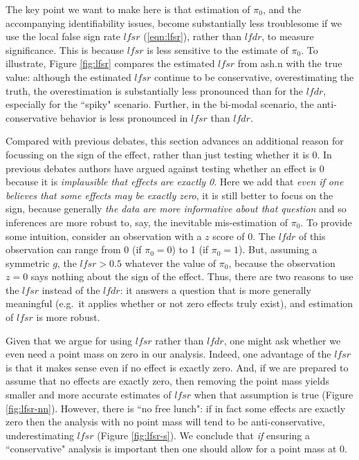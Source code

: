 \documentclass[11pt]{article}
\def\lfdr{\textit{lfdr}}
\def\lfsr{\textit{lfsr}}
\begin{document}
The key point we want to make here is that estimation of $\pi_0$, and the accompanying identifiability issues,
 become substantially less troublesome if we use the local false sign rate $\lfsr$ (\ref{eqn:lfsr}), rather than $\lfdr$, to measure significance. 
 This is because $\lfsr$ is less sensitive to the estimate of $\pi_0$.
To illustrate, Figure \ref{fig:lfsr} compares the estimated $\lfsr$ from ash.n with the true value: although the estimated $\lfsr$ continue to
be conservative, overestimating the truth, the overestimation is substantially less pronounced than for the $\lfdr$, especially for
the ``spiky" scenario. Further, in the bi-modal scenario, the anti-conservative behavior is less pronounced in $\lfsr$ than $\lfdr$.

Compared with previous debates, 
this section advances an additional reason for focussing on the sign of the effect, rather than just testing whether it is 0. 
In previous debates authors have argued against testing whether an effect is 0
because it is {\it implausible that effects are exactly 0}. Here we add that {\it even if one believes
that some effects may be exactly zero}, it is still better to focus on the sign, because generally {\it the data are more informative about that question}
and so inferences are more robust to, say, the inevitable mis-estimation of $\pi_0$.
To provide some intuition, consider an observation with a $z$ score of 0. The $\lfdr$ of this observation can range from 0 (if $\pi_0=0$)
to 1 (if $\pi_0=1$). But, assuming a symmetric $g$, the $\lfsr>0.5$ whatever the value of $\pi_0$, because the observation $z=0$ says
nothing about the sign of the effect.
Thus, there are two reasons to use the $\lfsr$ instead of the $\lfdr$: it answers a question that is more generally meaningful (e.g.~it applies
whether or not zero effects truly exist),  and estimation of $\lfsr$ is more robust. 
 
Given that we argue for using $\lfsr$ rather than $\lfdr$, one might ask whether we even need a point mass on zero in our analysis.
Indeed, one advantage of the $\lfsr$ is that it makes sense even if no effect is exactly zero. And, 
if we are prepared to assume that no effects are exactly zero, then removing the point mass 
yields smaller and more accurate estimates of $\lfsr$ when that assumption is true (Figure \ref{fig:lfsr-nn}). 
However, there is ``no free lunch":  if in fact some effects are exactly zero
then the analysis with no point mass will tend to be anti-conservative, underestimating $\lfsr$ (Figure \ref{fig:lfsr-s}). 
We conclude that {\it if} ensuring a ``conservative" analysis is important then one should allow for a point mass at 0. 
\end{document}
